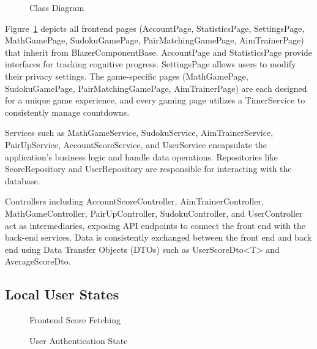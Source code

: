 \documentclass[11pt,a4paper]{article}
\newcommand{\inputdiagram}[1]{}
\newcommand{\textwidthdiagram}[2][1]{%
  \resizebox{#1\textwidth}{!}{\inputdiagram{#2}}%
}
\begin{document}
\begin{figure}[H]
    \centering
    \textwidthdiagram{class_diagram.latex}
    \caption{Class Diagram}
    \label{fig:class_diagram}
\end{figure}


Figure~\ref{fig:class_diagram} depicts all frontend pages (AccountPage, StatisticsPage, SettingsPage, MathGamePage, SudokuGamePage, PairMatchingGamePage, AimTrainerPage) that inherit from BlazerComponentBase. AccountPage and StatisticsPage provide interfaces for tracking cognitive progress. SettingsPage allows users to modify their privacy settings. The game-specific pages (MathGamePage, SudokuGamePage, PairMatchingGamePage, AimTrainerPage) are each designed for a unique game experience, and every gaming page utilizes a TimerService to consistently manage countdowns.

Services such as MathGameService, SudokuService, AimTrainerService, PairUpService, AccountScoreService, and UserService encapsulate the application's business logic and handle data operations. Repositories like ScoreRepository and UserRepository are responsible for interacting with the database.

Controllers including AccountScoreController, AimTrainerController, MathGameController, PairUpController, SudokuController, and UserController act as intermediaries, exposing API endpoints to connect the front end with the back-end services. Data is consistently exchanged between the front end and back end using Data Transfer Objects (DTOs) such as UserScoreDto<T> and AverageScoreDto. 

\subsection{Local User States}
\begin{figure}[H]
    \centering
    \begin{minipage}[b]{0.59\textwidth}
        \centering
        \textwidthdiagram{score_fetching_state.tex}
        \caption{Frontend Score Fetching}
        \label{fig:score_fetching_state}
    \end{minipage}
    \hfil
    \begin{minipage}[b]{0.4\textwidth}
        \centering
        \textwidthdiagram{user_authentication_state.tex}
        \caption{User Authentication State}
        \label{fig:user_authentication_state}
    \end{minipage}
\end{figure}
\end{document}
